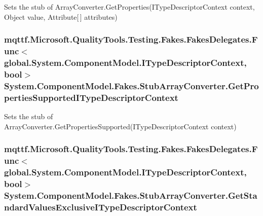 Sets the stub of Array\-Converter.\-Get\-Properties(\-I\-Type\-Descriptor\-Context context, Object value, Attribute\mbox{[}$\,$\mbox{]} attributes)

\hypertarget{class_system_1_1_component_model_1_1_fakes_1_1_stub_array_converter_aec7b053372dcce685c6020364f26c609}{
\subsubsection[{Get\-Properties\-Supported\-I\-Type\-Descriptor\-Context}]{\setlength{\rightskip}{0pt plus 5cm}mqttf.\-Microsoft.\-Quality\-Tools.\-Testing.\-Fakes.\-Fakes\-Delegates.\-Func$<$global.\-System.\-Component\-Model.\-I\-Type\-Descriptor\-Context, bool$>$ System.\-Component\-Model.\-Fakes.\-Stub\-Array\-Converter.\-Get\-Properties\-Supported\-I\-Type\-Descriptor\-Context}}\label{class_system_1_1_component_model_1_1_fakes_1_1_stub_array_converter_aec7b053372dcce685c6020364f26c609}


Sets the stub of Array\-Converter.\-Get\-Properties\-Supported(\-I\-Type\-Descriptor\-Context context)

\hypertarget{class_system_1_1_component_model_1_1_fakes_1_1_stub_array_converter_a8a8d49a420226e194f4202eb34cbd27f}{
\subsubsection[{Get\-Standard\-Values\-Exclusive\-I\-Type\-Descriptor\-Context}]{\setlength{\rightskip}{0pt plus 5cm}mqttf.\-Microsoft.\-Quality\-Tools.\-Testing.\-Fakes.\-Fakes\-Delegates.\-Func$<$global.\-System.\-Component\-Model.\-I\-Type\-Descriptor\-Context, bool$>$ System.\-Component\-Model.\-Fakes.\-Stub\-Array\-Converter.\-Get\-Standard\-Values\-Exclusive\-I\-Type\-Descriptor\-Context}}\label{class_system_1_1_component_model_1_1_fakes_1_1_stub_array_converter_a8a8d49a420226e194f4202eb34cbd27f}


